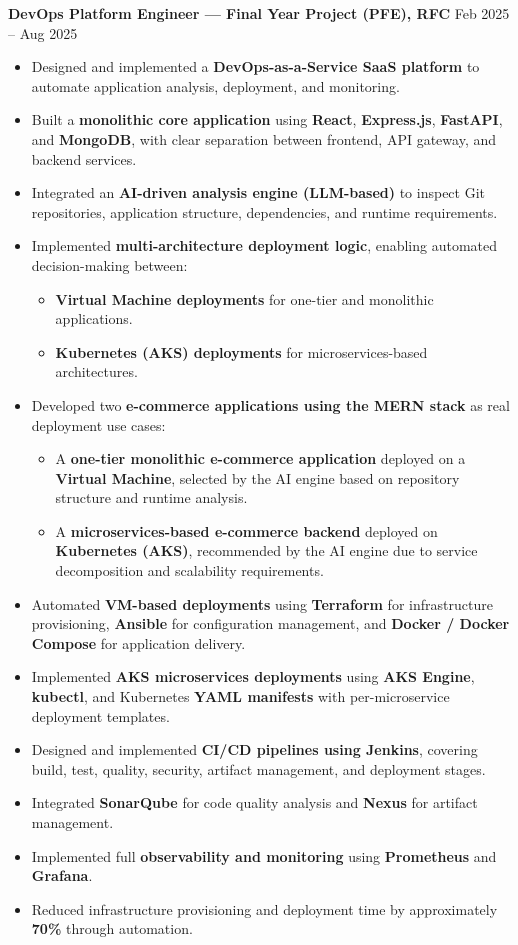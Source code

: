 \documentclass[10pt, letterpaper]{article}
\newenvironment{highlights}{
\begin{itemize}[leftmargin=12pt, itemsep=2pt]
}{
\end{itemize}
}
\begin{document}
\textbf{DevOps Platform Engineer --- Final Year Project (PFE), RFC} \hfill Feb 2025 -- Aug 2025
\begin{highlights}
\item Designed and implemented a \textbf{DevOps-as-a-Service SaaS platform} to automate application analysis, deployment, and monitoring.
\item Built a \textbf{monolithic core application} using \textbf{React}, \textbf{Express.js}, \textbf{FastAPI}, and \textbf{MongoDB}, with clear separation between frontend, API gateway, and backend services.
\item Integrated an \textbf{AI-driven analysis engine (LLM-based)} to inspect Git repositories, application structure, dependencies, and runtime requirements.
\item Implemented \textbf{multi-architecture deployment logic}, enabling automated decision-making between:
\begin{itemize}[leftmargin=16pt, itemsep=2pt]
  \item \textbf{Virtual Machine deployments} for one-tier and monolithic applications.
  \item \textbf{Kubernetes (AKS) deployments} for microservices-based architectures.
\end{itemize}
\item Developed two \textbf{e-commerce applications using the MERN stack} as real deployment use cases:
\begin{itemize}[leftmargin=16pt, itemsep=2pt]
  \item A \textbf{one-tier monolithic e-commerce application} deployed on a \textbf{Virtual Machine}, selected by the AI engine based on repository structure and runtime analysis.
  \item A \textbf{microservices-based e-commerce backend} deployed on \textbf{Kubernetes (AKS)}, recommended by the AI engine due to service decomposition and scalability requirements.
\end{itemize}
\item Automated \textbf{VM-based deployments} using \textbf{Terraform} for infrastructure provisioning, \textbf{Ansible} for configuration management, and \textbf{Docker / Docker Compose} for application delivery.
\item Implemented \textbf{AKS microservices deployments} using \textbf{AKS Engine}, \textbf{kubectl}, and Kubernetes \textbf{YAML manifests} with per-microservice deployment templates.
\item Designed and implemented \textbf{CI/CD pipelines using Jenkins}, covering build, test, quality, security, artifact management, and deployment stages.
\item Integrated \textbf{SonarQube} for code quality analysis and \textbf{Nexus} for artifact management.
\item Implemented full \textbf{observability and monitoring} using \textbf{Prometheus} and \textbf{Grafana}.
\item Reduced infrastructure provisioning and deployment time by approximately \textbf{70\%} through automation.
\end{highlights}
\end{document}
